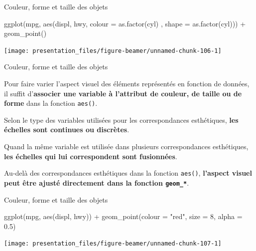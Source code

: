 \documentclass[12pt,ignorenonframetext,handout,]{beamer}
\newenvironment{Shaded}{}{}
\newcommand{\DataTypeTok}[1]{#1}
\newcommand{\DecValTok}[1]{#1}
\newcommand{\FloatTok}[1]{#1}
\newcommand{\KeywordTok}[1]{\textcolor[rgb]{0.00,0.00,1.00}{#1}}
\newcommand{\NormalTok}[1]{#1}
\newcommand{\OperatorTok}[1]{#1}
\newcommand{\StringTok}[1]{\textcolor[rgb]{0.00,0.50,0.50}{#1}}
\renewenvironment{Shaded}{\begin{snugshade}}{\end{snugshade}}
\begin{document}
\begin{frame}[fragile]{Couleur, forme et taille des objets}
\protect\hypertarget{couleur-forme-et-taille-des-objets-8}{}

\footnotesize \center

\begin{Shaded}
\begin{Highlighting}[]
\KeywordTok{ggplot}\NormalTok{(mpg, }\KeywordTok{aes}\NormalTok{(displ, hwy, }\DataTypeTok{colour =} \KeywordTok{as.factor}\NormalTok{(cyl)}
\NormalTok{  , }\DataTypeTok{shape =} \KeywordTok{as.factor}\NormalTok{(cyl))) }\OperatorTok{+}
\StringTok{  }\KeywordTok{geom_point}\NormalTok{()}
\end{Highlighting}
\end{Shaded}

\texttt{[image: presentation\_files/figure-beamer/unnamed-chunk-106-1]}

\end{frame}

\begin{frame}{Couleur, forme et taille des objets}
\protect\hypertarget{couleur-forme-et-taille-des-objets-9}{}

Pour faire varier l’aspect visuel des éléments représentés en fonction
de données, il suffit
d’\textbf{associer une variable à l'attribut de couleur, de taille ou de forme}
dans la fonction \texttt{aes()}.

Selon le type des variables utilisées pour les correspondances
esthétiques, \textbf{les échelles sont continues ou discrètes}.

Quand la même variable est utilisée dans plusieurs correspondances
esthétiques,
\textbf{les échelles qui lui correspondent sont fusionnées}.

Au-delà des correspondances esthétiques dans la fonction \texttt{aes()},
\textbf{l'aspect visuel peut être ajusté directement dans la fonction \texttt{geom\_*}}.

\end{frame}

\begin{frame}[fragile]{Couleur, forme et taille des objets}
\protect\hypertarget{couleur-forme-et-taille-des-objets-10}{}

\footnotesize \center

\begin{Shaded}
\begin{Highlighting}[]
\KeywordTok{ggplot}\NormalTok{(mpg, }\KeywordTok{aes}\NormalTok{(displ, hwy)) }\OperatorTok{+}
\StringTok{  }\KeywordTok{geom_point}\NormalTok{(}\DataTypeTok{colour =} \StringTok{"red"}\NormalTok{, }\DataTypeTok{size =} \DecValTok{8}\NormalTok{, }\DataTypeTok{alpha =} \FloatTok{0.5}\NormalTok{)}
\end{Highlighting}
\end{Shaded}

\texttt{[image: presentation\_files/figure-beamer/unnamed-chunk-107-1]}

\end{frame}
\end{document}
